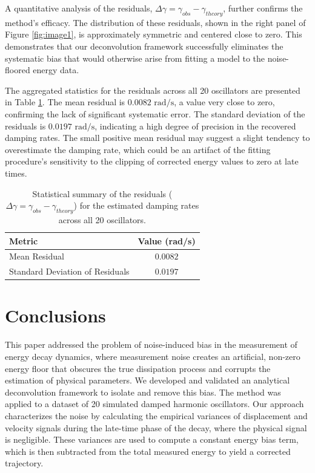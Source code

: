 \documentclass[]{article}
\begin{document}
A quantitative analysis of the residuals, $\Delta\gamma = \gamma_{obs} - \gamma_{theory}$, further confirms the method's efficacy. The distribution of these residuals, shown in the right panel of Figure \ref{fig:image1}, is approximately symmetric and centered close to zero. This demonstrates that our deconvolution framework successfully eliminates the systematic bias that would otherwise arise from fitting a model to the noise-floored energy data.

The aggregated statistics for the residuals across all 20 oscillators are presented in Table \ref{tab:residuals}. The mean residual is $0.0082 \text{ rad/s}$, a value very close to zero, confirming the lack of significant systematic error. The standard deviation of the residuals is $0.0197 \text{ rad/s}$, indicating a high degree of precision in the recovered damping rates. The small positive mean residual may suggest a slight tendency to overestimate the damping rate, which could be an artifact of the fitting procedure's sensitivity to the clipping of corrected energy values to zero at late times.

\begin{table}[h!]
    \centering
    \caption{Statistical summary of the residuals ($\Delta\gamma = \gamma_{obs} - \gamma_{theory}$) for the estimated damping rates across all 20 oscillators.}
    \label{tab:residuals}
    \begin{tabular}{lc}
        \hline
        \hline
        Metric & Value (rad/s) \\
        \hline
        Mean Residual & $0.0082$ \\
        Standard Deviation of Residuals & $0.0197$ \\
        \hline
    \end{tabular}
\end{table}

\section{Conclusions}
\label{sec:conclusions}
This paper addressed the problem of noise-induced bias in the measurement of energy decay dynamics, where measurement noise creates an artificial, non-zero energy floor that obscures the true dissipation process and corrupts the estimation of physical parameters. We developed and validated an analytical deconvolution framework to isolate and remove this bias. The method was applied to a dataset of 20 simulated damped harmonic oscillators. Our approach characterizes the noise by calculating the empirical variances of displacement and velocity signals during the late-time phase of the decay, where the physical signal is negligible. These variances are used to compute a constant energy bias term, which is then subtracted from the total measured energy to yield a corrected trajectory.
\end{document}

